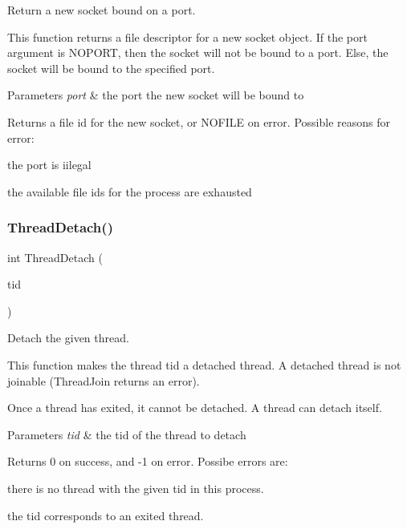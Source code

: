Return a new socket bound on a port. 

This function returns a file descriptor for a new socket object. If the {\ttfamily port} argument is N\+O\+P\+O\+RT, then the socket will not be bound to a port. Else, the socket will be bound to the specified port.


\begin{DoxyParams}{Parameters}
{\em port} & the port the new socket will be bound to \\
\hline
\end{DoxyParams}
\begin{DoxyReturn}{Returns}
a file id for the new socket, or N\+O\+F\+I\+LE on error. Possible reasons for error\+:
\begin{DoxyItemize}
\item the port is iilegal
\item the available file ids for the process are exhausted 
\end{DoxyItemize}
\end{DoxyReturn}
\mbox{\label{group__syscalls_ga5f957d985678728a418ff70a617fab4d}} 
\subsubsection{\texorpdfstring{Thread\+Detach()}{ThreadDetach()}}
{\footnotesize\ttfamily int Thread\+Detach (\begin{DoxyParamCaption}\item[{\hyperlink{group__syscalls_gaf67ad1c55e6b2a79bf8a99106380ce01}{Tid\+\_\+t}}]{tid }\end{DoxyParamCaption})}



Detach the given thread. 

This function makes the thread tid a detached thread. A detached thread is not joinable (Thread\+Join returns an error).

Once a thread has exited, it cannot be detached. A thread can detach itself.


\begin{DoxyParams}{Parameters}
{\em tid} & the tid of the thread to detach \\
\hline
\end{DoxyParams}
\begin{DoxyReturn}{Returns}
0 on success, and -\/1 on error. Possibe errors are\+:
\begin{DoxyItemize}
\item there is no thread with the given tid in this process.
\item the tid corresponds to an exited thread. 
\end{DoxyItemize}
\end{DoxyReturn}
\mbox{\label{group__syscalls_ga9ffbb344eb33487ceef5442846a74be0}} 
